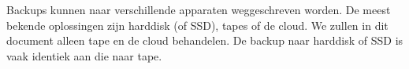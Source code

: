 Backups kunnen naar verschillende apparaten weggeschreven worden. De meest bekende oplossingen zijn harddisk (of SSD), tapes of de cloud. We zullen in dit document alleen tape en de cloud behandelen. De backup naar harddisk of SSD is vaak identiek aan die naar tape.

